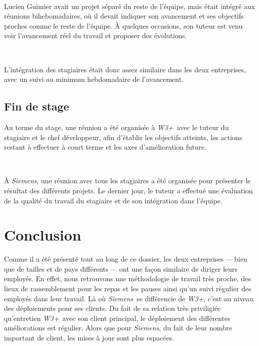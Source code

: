\documentclass[a4paper, oneside, 12pt]{article}
\newcommand\sectionSpeciale[1]{\addcontentsline{toc}{section}{#1}\section*{#1}}
\def\www{\emph{W3+}}
\def\siemens{\emph{Siemens}}
\begin{document}
\ 

Lucien {\sc Guimier} avait un projet séparé du reste de l’équipe, mais était intégré aux réunions bihebomadaires, où il devait indiquer son avancement et ses objectifs proches comme le reste de l’équipe. À quelques occasions, son tuteur est venu voir l’avancement réel du travail et proposer des évolutions.

\ 

L’intégration des stagiaires était donc assez similaire dans les deux entreprises, avec un suivi au minimum hebdomadaire de l’avancement.

\subsection{Fin de stage}

Au terme du stage, une réunion a été organisée à \www\ avec le tuteur du stagiaire et le chef développeur, afin d’établir les objectifs atteints, les actions restant à effectuer à court terme et les axes d’amélioration future.

\ 

À \siemens, une réunion avec tous les stagiaires a été organisée pour présenter le résultat des différents projets. Le dernier jour, le tuteur a effectué une évaluation de la qualité du travail du stagiaire et de son intégration dans l’équipe.

\vfill

\sectionSpeciale{Conclusion}

Comme il a été présenté tout au long de ce dossier, les deux entreprises —$~$bien que de tailles et de pays différents$~$— ont une façon similaire de diriger leurs employés. En effet, nous retrouvons une méthodologie de travail très proche, des lieux de rassemblement pour les repas et les pauses ainsi qu'un suivi régulier des employés dans leur travail. Là où \siemens\ se différencie de \www, c'est au niveau des déploiements pour ses clients. Du fait de sa relation très priviligiée qu'entretien \www\ avec son client principal, le déploiement des différentes améliorations est régulier. Alors que pour \siemens, du fait de leur nombre important de client, les mises à jour sont plus espacées.

\vfill
\end{document}
